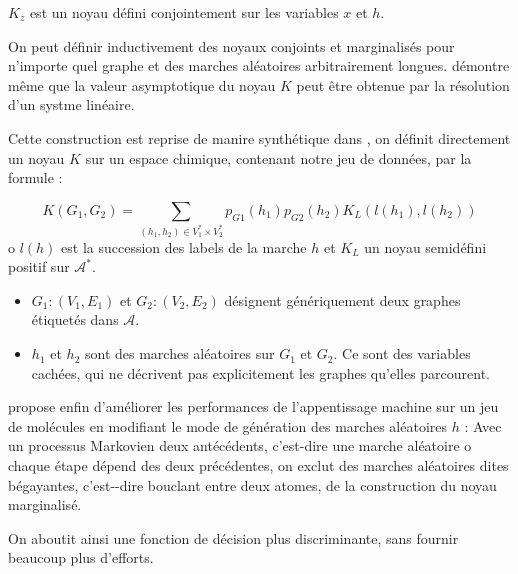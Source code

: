 \par
$K_z$ est un noyau d\'efini conjointement sur les variables $x$ et $h$.

\par
On peut d\'efinir inductivement des noyaux conjoints et marginalis\'es pour n'importe quel graphe et des marches al\'eatoires arbitrairement longues. %
\cite{Ka} d\'emontre m\^eme que la valeur asymptotique du noyau $K$ peut \^etre obtenue par la r\'esolution d'un systme lin\'eaire.

\ligneinter
Cette construction est reprise de manire synth\'etique dans \cite{Mahe}, on d\'efinit directement un noyau $K$ sur un espace chimique, contenant notre jeu de donn\'ees, par la formule :

\begin{equation}
K(G_1,G_2) = \sum_{(h_1,h_2) \in V_1^{\ast} \times V_2^{\ast}} p_{G1}(h_1) p_{G2}(h_2) K_L(l(h_1),l(h_2))
\end{equation}
o $l(h)$ est la succession des labels de la marche $h$ et $K_L$ un noyau semid\'efini positif sur $\mathcal{A}^{\ast}$.

\begin{itemize}
\item $G_1:(V_1,E_1)$ et $G_2:(V_2,E_2)$ d\'esignent g\'en\'eriquement deux graphes \'etiquet\'es dans $\mathcal{A}$.
\item $h_1$ et $h_2$ sont des marches al\'eatoires sur $G_1$ et $G_2$. %
Ce sont des variables cach\'ees, qui ne d\'ecrivent pas explicitement les graphes qu'elles parcourent.
\end{itemize}

\ligneinter
\cite{Mahe} propose enfin d'am\'eliorer les performances de l'appentissage machine sur un jeu de mol\'ecules en modifiant %
le mode de g\'en\'eration des marches al\'eatoires \og{} $h$\fg{} : %
Avec un processus Markovien  deux ant\'ec\'edents, c'est-dire une marche al\'eatoire o chaque \'etape d\'epend des deux pr\'ec\'edentes, %
on exclut des marches al\'eatoires dites b\'egayantes, c'est--dire bouclant entre deux atomes, de la construction du noyau marginalis\'e.

\par
On aboutit ainsi  une fonction de d\'ecision plus discriminante, sans fournir beaucoup plus d'efforts.